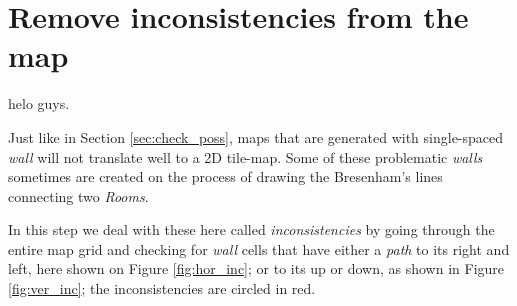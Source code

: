 \section{Remove inconsistencies from the map}

helo guys.

Just like in Section \ref{sec:check_poss}, maps that are generated with single-spaced \emph{wall} will not translate well to a 2D tile-map. Some of these problematic \emph{walls} sometimes are created on the process of drawing the Bresenham's lines connecting two \emph{Rooms}.

In this step we deal with these here called \emph{inconsistencies} by going through the entire map grid and checking for \emph{wall} cells that have either a \emph{path} to its right and left, here shown on Figure \ref{fig:hor_inc}; or to its up or down, as shown in Figure \ref{fig:ver_inc}; the inconsistencies are circled in red.

